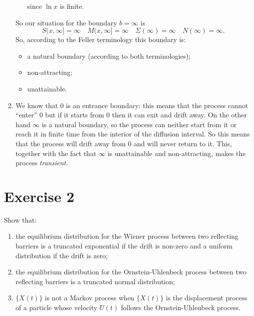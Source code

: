 \documentclass[12pt]{article}
\begin{document}
\begin{enumerate}
\begin{itemize}
\begin{equation*}
			\end{equation*}
			since $\ln x$ is finite.
		\end{itemize}
		So our situation for the boundary $b=\infty$ is
		\begin{equation*}
			S(x,\infty]=\infty\quad M(x,\infty]=\infty\quad \Sigma(\infty)=\infty \quad N(\infty)=\infty.
		\end{equation*}
		So, according to the Feller terminology this boundary is:
		\begin{itemize}[$\diamond$]
			\item a natural boundary (according to both terminologies);
			\item non-attracting;
			\item unattainable.
		\end{itemize}
		\item We know that $0$ is an entrance boundary: this means that the process cannot ``enter'' 0 but if it starts from 0 then it can exit and drift away. On the other hand $\infty$ is a natural boundary, so the process can neither start from it or reach it in finite time from the interior of the diffusion interval. 
		So this means that the process will drift away from 0 and will never return to it. This, together with the fact that $\infty$ is unattainable and non-attracting, makes the process \emph{transient.}
	\end{enumerate}
	\section*{Exercise 2}
	Show that:
	\begin{enumerate}
		\item the equilibrium distribution for the Wiener process between two reflecting barriers is a truncated exponential if the drift is non-zero and a uniform distribution if the drift is zero;
		\item the equilibrium distribution for the Ornstein-Uhlenbeck process between two reflecting barriers is a truncated normal distribution;
		\item $\{X(t)\}$ is not a Markov process when $\{X(t)\}$ is the displacement process of a particle whose velocity $U(t)$ follows the Ornstein-Uhlenbeck process.
	\end{enumerate}
	
\end{document}
